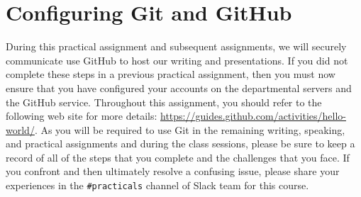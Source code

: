 \section*{Configuring Git and GitHub}

During this practical assignment and subsequent assignments, we will securely communicate use GitHub to host our writing
and presentations. If you did not complete these steps in a previous practical assignment, then you must now ensure that
you have configured your accounts on the departmental servers and the GitHub service. Throughout this assignment, you
should refer to the following web site for more details: \url{https://guides.github.com/activities/hello-world/}. As you
will be required to use Git in the remaining writing, speaking, and practical assignments and during the class sessions,
please be sure to keep a record of all of the steps that you complete and the challenges that you face. If you confront
and then ultimately resolve a confusing issue, please share your experiences in the {\tt \#practicals} channel of Slack
team for this course.

